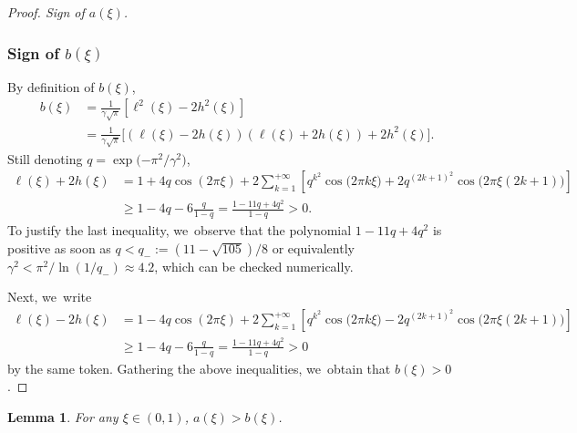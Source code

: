 \documentclass[JEP,XML,SOM,Unicode,NoFloatCountersInSection,published]{cedram}
\newtheorem{lemme}[theorem]{Lemma}
\theoremstyle{definition}
\let\EE\exp
\newcommand{\pa}[1]{\left(#1\right)}
\newcommand{\pac}[1]{\left[#1\right]}
\newcommand{\bpac}[1]{\bigl[#1\bigr]}
\begin{document}
\begin{proof}[Proof. Sign of $a(\xi)$]
\subsubsection*{Sign of $b(\xi)$} By definition of $b(\xi)$,
\begin{align}
b(\xi) &= \frac{1}{\gamma\sqrt{\pi}}\pac{\ell^2(\xi)-2h^2(\xi)} \nonumber \\
&= \frac{1}{\gamma\sqrt{\pi}}\bpac{\pa{\ell(\xi)-2h(\xi)}\pa{\ell(\xi)+2h(\xi)}+2h^2(\xi)}.\label{form_bxi}
\end{align}
Still denoting $q= \EE\bigl({-{\pi^2}/{\gamma^2}}\bigr)$,
\begin{align*}
\ell(\xi) + 2 h(\xi) &= 1 + 4q\cos\pa{2\pi\xi} + 2\sum_{k=1}^{+\infty}\pac{q^{k^2}\cos\bigl({2\pi k\xi}\bigr)+2q^{(2k+1)^2}\cos\bigl(2\pi\xi(2k+1)\bigr)} \\
&\geq 1 -4q -6\frac{q}{1-q} = \frac{1-11q+4q^2}{1-q} >0.
\end{align*}
To justify the last inequality, we~observe that the polynomial $1-11q+4q^2$ is positive as soon as $q < q_-:= ({11-\sqrt{105}})/{8}$ or equivalently $\gamma^2 < {\pi^2}/\ln(1/q_-) \approx 4.2$, which can be checked numerically.

Next, we~write
\begin{align*}
\ell(\xi) - 2 h(\xi) &= 1 - 4q\cos\pa{2\pi\xi} + 2\sum_{k=1}^{+\infty}\pac{q^{k^2}\cos\bigl({2\pi k\xi}\bigr)-2q^{(2k+1)^2}\cos\bigl(2\pi\xi(2k+1)\bigr)} \\
&\geq 1 -4q -6\frac{q}{1-q} = \frac{1-11q+4q^2}{1-q} >0
\end{align*}
by the same token. Gathering the above inequalities, we~obtain that $b(\xi)>0$.
\end{proof}

\begin{lemme}
For any $\xi \in (0,1)$, $a(\xi) > b(\xi)$.
\end{lemme}
\end{document}
